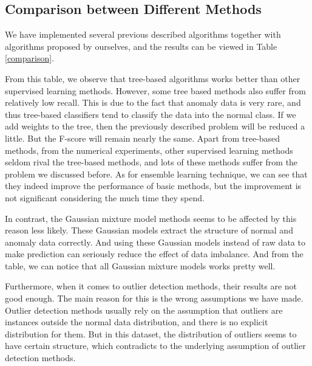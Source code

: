 \documentclass[english]{article}
\begin{document}
\subsection{Comparison between Different Methods}
\par We have implemented several previous described algorithms together with algorithms proposed by ourselves, and the results can be viewed in Table \ref{comparison}.
\par From this table, we observe that tree-based algorithms works better than other supervised learning methods. However, some tree based methods also suffer from relatively low recall. This is due to the fact that anomaly data is very rare, and thus tree-based classifiers tend to classify the data into the normal class. If we add weights to the tree, then the previously described problem will be reduced a little. But the F-score will remain nearly the same. Apart from tree-based methods, from the numerical experiments, other supervised learning methods seldom rival the tree-based methods, and lots of these methods suffer from the problem we discussed before. As for ensemble learning technique, we can see that they indeed improve the performance of basic methods, but the improvement is not significant considering the much time they spend.
\par In contrast, the Gaussian mixture model methods seems to be affected by this reason less likely. These Gaussian models extract the structure of normal and anomaly data correctly. And using these Gaussian models instead of raw data to make prediction can seriously reduce the effect of data imbalance. And from the table, we can notice that all Gaussian mixture models works pretty well.
\par Furthermore, when it comes to outlier detection methods, their results are not good enough. The main reason for this is the wrong assumptions we have made. Outlier detection methods usually rely on the assumption that outliers are instances outside the normal data distribution, and there is no explicit distribution for them. But in this dataset, the distribution of outliers seems to have certain structure, which contradicts to the underlying assumption of outlier detection methods.
\end{document}
